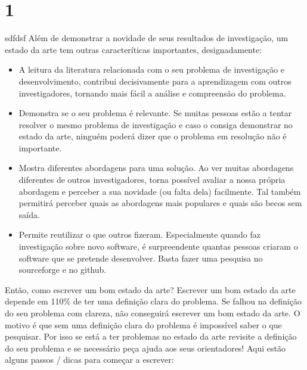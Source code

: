\section{1}
sdfdsf
Além de demonstrar a novidade de seus resultados de investigação, um estado da arte tem outras caracteríticas importantes, designadamente:
\begin{itemize}
  \item A leitura da literatura relacionada com o seu problema de investigação e desenvolvimento, contribui decisivamente para a aprendizagem com outros investigadores, tornando mais fácil a análise e compreensão do problema.
  \item Demonstra se o seu problema é relevante. Se muitas pessoas estão a tentar resolver o mesmo problema de investigação e caso o consiga demonstrar no estado da arte, ninguém poderá dizer que o problema em resolução não é importante.
  \item Mostra diferentes abordagens para uma solução. Ao ver muitas abordagens diferentes de outros investigadores, torna possível avaliar a nossa própria abordagem e perceber a sua novidade (ou falta dela) facilmente. Tal também permitirá perceber quais as abordagens mais populares e quais são becos sem saída.
  \item Permite reutilizar o que outros fizeram. Especialmente quando faz investigação sobre novo software, é surpreendente quantas pessoas criaram o software que se pretende desenvolver. Basta fazer uma pesquisa no sourceforge e no github.
\end{itemize}

Então, como escrever um bom estado da arte? Escrever um bom estado da arte depende em 110\% de ter uma definição clara do problema. Se falhou na definição do seu problema com clareza, não conseguirá escrever um bom estado da arte. O motivo é que sem uma definição clara do problema é impossível saber o que pesquisar. Por isso se está a ter problemas no estado da arte revisite a definição do seu problema e se necessário peça ajuda aos seus orientadores! Aqui estão alguns passos / dicas para começar a escrever:

